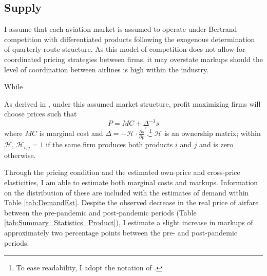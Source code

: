 \documentclass{article}
\begin{document}
	\subsection{Supply}
	\label{sec:Analysis_Supply}
	I assume that each aviation market is assumed to operate under Bertrand competition with differentiated products following the exogenous determination of quarterly route structure. As this model of competition does not allow for coordinated pricing strategies between firms, it may overstate markups should the level of coordination between airlines is high within the industry. 

    While 
    
    As derived in \citet{berry_automobile_1995}, under this assumed market structure, profit maximizing firms will choose prices such that \[P = MC + \Delta^{-1} s\] where $MC$ is marginal cost and $\Delta = - \mathcal{H} \cdot \frac{\partial s}{\partial p}^{'}$.\footnote{To ease readability, I adopt the notation of \citet{conlon_best_2020}.} $\mathcal{H}$ is an ownership matrix; within $\mathcal{H}$, $\mathcal{H}_{i,j} = 1$ if the same firm produces both products $i$ and $j$ and is zero otherwise.

    Through the pricing condition and the estimated own-price and cross-price elasticities, I am able to estimate both marginal costs and markups. Information on the distribution of these are included with the estimates of demand within Table \ref{tab:DemandEst}. Despite the observed decrease in the real price of airfare between the pre-pandemic and post-pandemic periods (Table \ref{tab:Summary_Statistics_Product}), I estimate a slight increase in markups of approximately two percentage points between the pre- and post-pandemic periods.  
	
	
\end{document}
